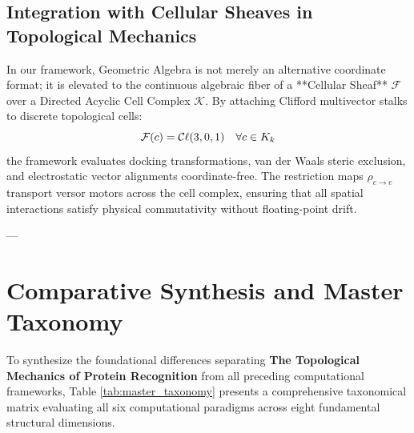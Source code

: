 \subsection{Integration with Cellular Sheaves in Topological Mechanics}
In our framework, Geometric Algebra is not merely an alternative coordinate format; it is elevated to the continuous algebraic fiber of a **Cellular Sheaf** $\mathcal{F}$ over a Directed Acyclic Cell Complex $\mathcal{K}$. By attaching Clifford multivector stalks to discrete topological cells:
\begin{equation}
    \mathcal{F}(c) = \mathcal{C}\ell(3,0,1) \quad \forall c \in K_k
\end{equation}
the framework evaluates docking transformations, van der Waals steric exclusion, and electrostatic vector alignments coordinate-free. The restriction maps $\rho_{c \to e}$ transport versor motors across the cell complex, ensuring that all spatial interactions satisfy physical commutativity without floating-point drift.

---

\section{Comparative Synthesis and Master Taxonomy}
\label{sec:master_taxonomy}

To synthesize the foundational differences separating \textbf{The Topological Mechanics of Protein Recognition} from all preceding computational frameworks, Table \ref{tab:master_taxonomy} presents a comprehensive taxonomical matrix evaluating all six computational paradigms across eight fundamental structural dimensions.

